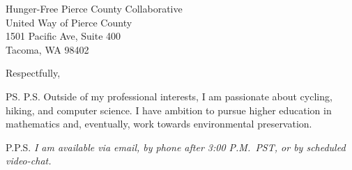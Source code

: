 \documentclass{letter}
\begin{document}
\begin{letter}{Hunger-Free Pierce County Collaborative \\ United Way of Pierce County \\ 1501 Pacific Ave, Suite 400 \\ Tacoma, WA 98402}
\closing{Respectfully,}
\ps P.S. Outside of my professional interests, I am passionate about cycling, hiking, and computer science. I have ambition to pursue higher education in mathematics and, eventually, work towards environmental preservation. 

P.P.S. \emph{I am available via email, by phone after 3:00 P.M.\ PST, or by scheduled video-chat.}

\end{letter}
\end{document}
